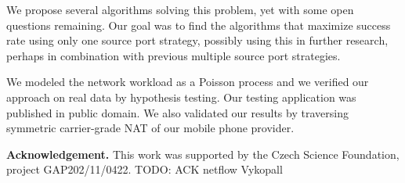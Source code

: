 \documentclass{acm_proc_article-sp}
\begin{document}
We propose several algorithms solving this problem, yet with some open questions remaining. 
Our goal was to find the algorithms that maximize success rate using only one source port strategy, possibly using this
in further research, perhaps in combination with previous multiple source port strategies.

We modeled the network workload as a Poisson process and we verified our approach on real data by hypothesis testing.
Our testing application was published in public domain. We also validated our results by traversing symmetric 
carrier-grade NAT of our mobile phone provider.

\par\smallskip
\noindent\textbf{Acknowledgement.} 
This work was supported by the Czech Science Foundation, project GAP202/11/0422. TODO: ACK netflow Vykopall

% 



\end{document}
